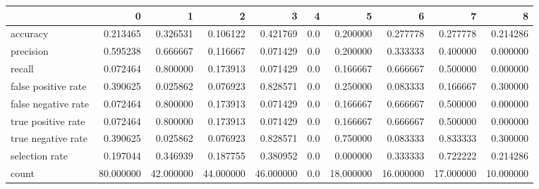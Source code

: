 \begin{tabular}{lrrrrrrrrr}
\toprule
{} &          0 &          1 &          2 &          3 &    4 &          5 &          6 &          7 &          8 \\
\midrule
accuracy            &   0.213465 &   0.326531 &   0.106122 &   0.421769 &  0.0 &   0.200000 &   0.277778 &   0.277778 &   0.214286 \\
precision           &   0.595238 &   0.666667 &   0.116667 &   0.071429 &  0.0 &   0.200000 &   0.333333 &   0.400000 &   0.000000 \\
recall              &   0.072464 &   0.800000 &   0.173913 &   0.071429 &  0.0 &   0.166667 &   0.666667 &   0.500000 &   0.000000 \\
false positive rate &   0.390625 &   0.025862 &   0.076923 &   0.828571 &  0.0 &   0.250000 &   0.083333 &   0.166667 &   0.300000 \\
false negative rate &   0.072464 &   0.800000 &   0.173913 &   0.071429 &  0.0 &   0.166667 &   0.666667 &   0.500000 &   0.000000 \\
true positive rate  &   0.072464 &   0.800000 &   0.173913 &   0.071429 &  0.0 &   0.166667 &   0.666667 &   0.500000 &   0.000000 \\
true negative rate  &   0.390625 &   0.025862 &   0.076923 &   0.828571 &  0.0 &   0.750000 &   0.083333 &   0.833333 &   0.300000 \\
selection rate      &   0.197044 &   0.346939 &   0.187755 &   0.380952 &  0.0 &   0.000000 &   0.333333 &   0.722222 &   0.214286 \\
count               &  80.000000 &  42.000000 &  44.000000 &  46.000000 &  0.0 &  18.000000 &  16.000000 &  17.000000 &  10.000000 \\
\bottomrule
\end{tabular}
